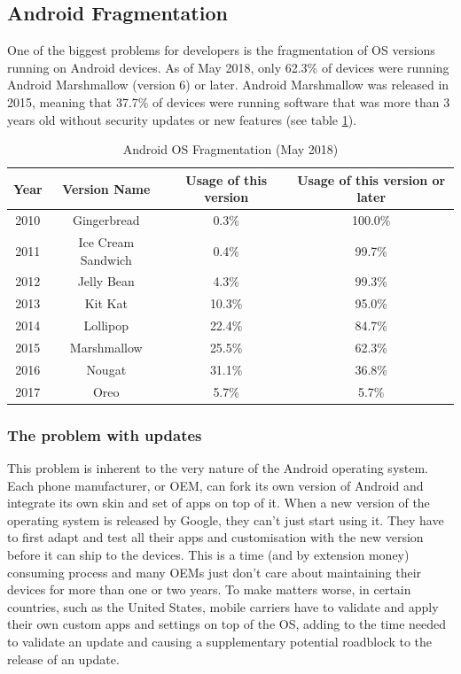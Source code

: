 \documentclass[11pt,a4paper]{report}
\begin{document}
\subsection{Android Fragmentation}
One of the biggest problems for developers is the fragmentation of OS versions running on Android devices. As of May 2018, only 62.3\% of devices were running Android Marshmallow (version 6) or later. Android Marshmallow was released in 2015, meaning that 37.7\% of devices were running software that was more than 3 years old without security updates or new features (see table \ref{android_os_table}).

\begin{table}[H]
\centering
\bgroup
\def\arraystretch{1.5}%
\begin{tabular}{|c|c|c|c|}
\hline
  \textbf{Year} & \textbf{Version Name} & \textbf{Usage of this version} & \textbf{Usage of this version or later}\\
  \hline
2010 & Gingerbread & 0.3\% & 100.0\% \\
\hline
2011 & Ice Cream Sandwich & 0.4\% & 99.7\% \\
\hline
2012 & Jelly Bean & 4.3\% & 99.3\% \\
\hline
2013 & Kit Kat & 10.3\% & 95.0\% \\
\hline
2014 & Lollipop & 22.4\% & 84.7\% \\
\hline
2015 & Marshmallow & 25.5\% & 62.3\% \\
\hline
2016 & Nougat & 31.1\% & 36.8\% \\
\hline
2017 & Oreo & 5.7\% & 5.7\% \\
\hline
\end{tabular}
\egroup
\label{android_os_table}
\caption{Android OS Fragmentation (May 2018)\cite{android:dev:osfragmentation}}
\end{table}

\subsubsection{The problem with updates}
This problem is inherent to the very nature of the Android operating system. Each phone manufacturer, or OEM, can fork its own version of Android and integrate its own skin and set of apps on top of it. When a new version of the operating system is released by Google, they can't just start using it. They have to first adapt and test all their apps and customisation with the new version before it can ship to the devices. This is a time (and by extension money) consuming process and many OEMs just don't care about maintaining their devices for more than one or two years. To make matters worse, in certain countries, such as the United States, mobile carriers have to validate and apply their own custom apps and settings on top of the OS, adding to the time needed to validate an update and causing a supplementary potential roadblock to the release of an update.
\end{document}

